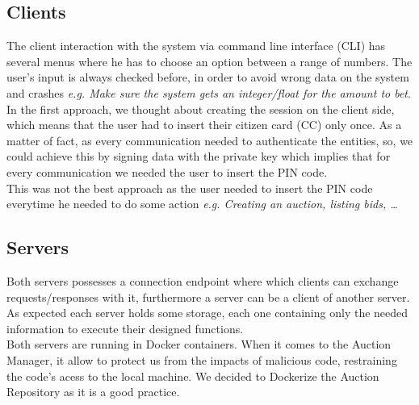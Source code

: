 \documentclass[12pt]{article}
\begin{document}
\subsection{Clients}
\label{subsec:clients}
The client interaction with the system via command line interface (CLI) has several menus where
  he has to choose an option between a range of numbers. The user's input is always
  checked before, in order to avoid wrong data on the system and crashes \textit{e.g. Make sure the system gets an integer/float for the amount to bet}.\\

In the first approach, we thought about creating the session on the client side, which means that
  the user had to insert their citizen card (CC) only once. As a matter of fact, as every communication
  needed to authenticate the entities, so, we could achieve this by signing data with the private key
  which implies that for every communication we needed the user to insert the PIN code.\\
  This was not the best approach as the user needed to insert the PIN code everytime he needed to do some action \textit{e.g. Creating an auction, listing bids, \ldots }


\subsection{Servers}
Both servers possesses a connection endpoint where which clients can exchange requests/responses with it, furthermore 
a server can be a client of another server. \\
As expected each server holds some storage, each one containing only the needed information to execute their designed functions.\\

Both servers are running in Docker containers. When it comes to the Auction Manager, it allow to protect us from the impacts of malicious code, restraining the code's acess to the local machine. We decided to Dockerize the Auction Repository as it is a good practice.
\end{document}
